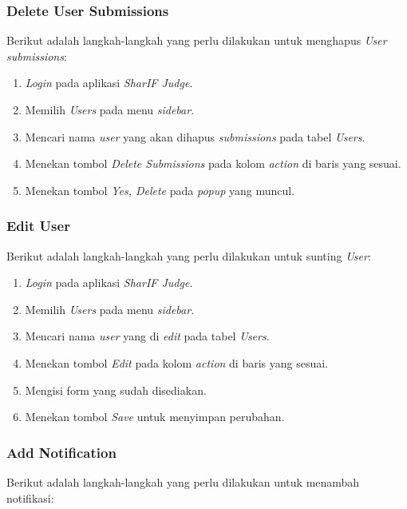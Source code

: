\subsubsection{Delete User Submissions}
\label{subsubsec:skenario_delete_user_submissions}
Berikut adalah langkah-langkah yang perlu dilakukan untuk menghapus \textit{User submissions}:

\begin{enumerate}
	\item \textit{Login} pada aplikasi \textit{SharIF Judge}.
	\item Memilih \textit{Users} pada menu \textit{sidebar}.
	\item Mencari nama \textit{user} yang akan dihapus \textit{submissions} pada tabel \textit{Users}.
	\item Menekan tombol \textit{Delete Submissions} pada kolom \textit{action} di baris yang sesuai.
	\item Menekan tombol \textit{Yes, Delete} pada \textit{popup} yang muncul.
\end{enumerate}

\subsubsection{Edit User}
\label{subsubsec:skenario_edit_user}
Berikut adalah langkah-langkah yang perlu dilakukan untuk sunting \textit{User}:

\begin{enumerate}
	\item \textit{Login} pada aplikasi \textit{SharIF Judge}.
	\item Memilih \textit{Users} pada menu \textit{sidebar}.
	\item Mencari nama \textit{user} yang di \textit{edit} pada tabel \textit{Users}.
	\item Menekan tombol \textit{Edit} pada kolom \textit{action} di baris yang sesuai.
	\item Mengisi form yang sudah disediakan.
	\item Menekan tombol \textit{Save} untuk menyimpan perubahan.
\end{enumerate}

\subsubsection{Add Notification}
\label{subsubsec:skenario_add_notification}
Berikut adalah langkah-langkah yang perlu dilakukan untuk menambah notifikasi:

